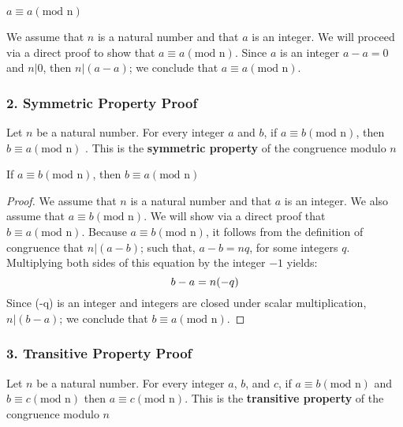 \begin{definition}
\begin{tcolorbox}
	\begin{theorem}
		$a \equiv a (\text{mod n})$
	\end{theorem}
\end{tcolorbox}

We assume that $n$ is a natural number and that $a$ is an integer. We will proceed via a direct proof to show that $a \equiv a (\text{mod n})$. Since $a$ is an integer $a-a = 0$ and $n | 0$, then $n|(a-a)$; we conclude that $a \equiv a (\text{mod n})$.






\subsubsection*{2. Symmetric Property Proof}
Let $n$ be a natural number. For every integer $a$ and $b$, if $a \equiv b (\text{mod n})$, then $b \equiv a (\text{mod n})$ . This is the {\bf symmetric  property} of the congruence modulo $n$

\begin{tcolorbox}
	\begin{theorem}
		If $a \equiv b (\text{mod n})$, then $b \equiv a (\text{mod n})$
	\end{theorem}
\end{tcolorbox}

\begin{proof}
We assume that $n$ is a natural number and that $a$ is an integer. We also assume that $a \equiv b (\text{mod n})$. We will show via a direct proof that $b \equiv a (\text{mod n})$. Because $a \equiv b (\text{mod n})$, it follows from the definition of congruence that $n|(a-b)$; such that, $a-b = nq$, for some integers $q$. Multiplying both sides of this equation by the integer $-1$ yields: 
	\begin{equation}
		b-a = n(-q) \nonumber \\
	\end{equation}
Since (-q) is an integer and integers are closed under scalar multiplication, $n | (b-a)$; we conclude that $b \equiv a (\text{mod n})$. 
\end{proof}



\subsubsection*{3. Transitive Property Proof} 
Let $n$ be a natural number. For every integer $a$, $b$, and $c$, if $a \equiv b (\text{mod n})$ and $b \equiv c (\text{mod n})$ then $a \equiv c (\text{mod n})$. This is the {\bf transitive property} of the congruence modulo $n$


\end{definition}
